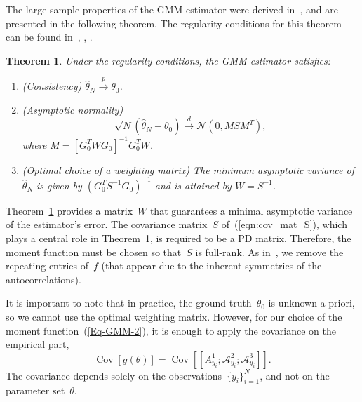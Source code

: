 \documentclass{article}
\newtheorem{theorem}[assumption]{Theorem}%
\newcommand{\A}[0]{\mathcal{A}}
\newcommand{\Cov}[0]{\operatorname{Cov}}
\begin{document}

The large sample properties of the GMM estimator were derived in~\cite{Hansen1982}, and are presented in the following theorem. The regularity conditions for this theorem can be found in~\cite{Hansen1982}, \cite{Hall2005}, \cite{abas2021generalized}.

\begin{theorem}\label{Thm-2-6}
	Under {the} regularity conditions, the GMM estimator satisfies:
	\begin{enumerate}[label={\Alph*}.]
		\item  \label{Thm-2-2}
		\textnormal{(Consistency)} $\hat{\theta}_N \overset{p}{\to} \theta_0$.

		\item \label{Thm-2-3} \textnormal{(Asymptotic normality)}
		\[\sqrt{N} ( \hat{\theta}_N - \theta_0) \overset{d}{\to} \mathcal{N}(0, M S M^T ),\] where $M =[G_0^T W  G_0]^{-1} G_0^T  W$.

		\item \label{Thm-2-5} \textnormal{(Optimal choice of a weighting matrix)} The minimum asymptotic variance of $\hat{\theta}_N$ is given by $(G_0^T S^{-1} G_0)^{-1}$ and is attained by $W = S^{-1}$.
	\end{enumerate}
\end{theorem}
Theorem~\ref{Thm-2-6} provides a matrix~$W$ {that} guarantees a minimal asymptotic variance of the estimator’s error. The covariance matrix~$S$ {of~(\ref{eqn:cov_mat_S}), which plays a central role in Theorem~\ref{Thm-2-6},} is required to be a PD matrix. Therefore, the moment function must be chosen so that~$S$ is full-rank. As in~\cite{abas2021generalized},  we remove the repeating entries of~$f$ (that appear due to the inherent symmetries of the autocorrelations).

It is important to note that in practice, the ground truth~$\theta_0$ is unknown a priori, so we cannot use the optimal weighting matrix. However, for our choice of the moment function~(\ref{Eq-GMM-2}), it is enough to apply the covariance on the empirical part,
	\begin{equation}\label{Eq-2-7}
		\Cov[g(\theta)] = \Cov\left[\left[A_{y_i}^1;\A_{y_i}^2;\A_{y_i}^3\right]\right].
	\end{equation}
The covariance depends solely on the observations~$\{y_i\}_{i=1}^N$, and  not on  the parameter set~$\theta$.
\end{document}
